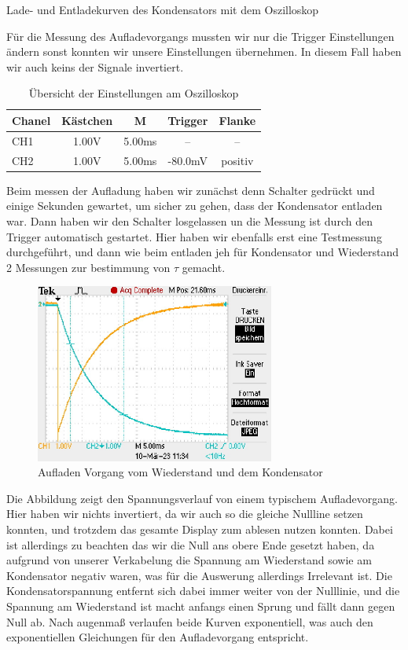 \documentclass[twoside]{protokoll}
\begin{document}
\begin{aufgabe}{Lade- und Entladekurven des Kondensators mit dem Oszilloskop}
 
Für die Messung des Aufladevorgangs mussten wir nur die Trigger Einstellungen ändern sonst konnten wir unsere Einstellungen übernehmen.
In diesem Fall haben wir auch keins der Signale invertiert. 

\begin{table}[H]
        \centering
        \begin{tabularx}{0.8\textwidth}{X c c c c} %
            \toprule
            \textbf{Chanel} & \textbf{Kästchen} & \textbf{M} & \textbf{Trigger} & \textbf{Flanke} \\
            \midrule
            CH1 & 1.00V & 5.00ms & -- & -- \\
            CH2 & 1.00V & 5.00ms & -80.0mV & positiv \\
            \bottomrule
        \end{tabularx}
        \caption{Übersicht der Einstellungen am Oszilloskop}
        \label{tab:mytable}
    \end{table}
    
Beim messen der Aufladung haben wir zunächst denn Schalter gedrückt und einige Sekunden gewartet, um sicher zu gehen, dass der Kondensator entladen war. 
Dann haben wir den Schalter losgelassen un die Messung ist durch den Trigger automatisch gestartet. 
Hier haben wir ebenfalls erst eine Testmessung durchgeführt, und dann wie beim entladen jeh für Kondensator und Wiederstand 2 Messungen zur bestimmung von $\tau$ gemacht. 

\begin{figure}[H]
  \centering
    \includegraphics[width=0.7\textwidth]{Bilder_Osziloskop/Aufladen_Kondensator_02.pdf}
    \caption{Aufladen Vorgang vom Wiederstand und dem Kondensator}
  \centering
\end{figure}
Die Abbildung zeigt den Spannungsverlauf von einem typischem Aufladevorgang.
Hier haben wir nichts invertiert, da wir auch so die gleiche Nullline setzen konnten, und trotzdem das gesamte Display zum ablesen nutzen konnten.
Dabei ist allerdings zu beachten das wir die Null ans obere Ende gesetzt haben, da aufgrund von unserer Verkabelung die Spannung am Wiederstand sowie am Kondensator negativ waren, was für die Auswerung allerdings Irrelevant ist.
Die Kondensatorspannung entfernt sich dabei immer weiter von der Nulllinie, und die Spannung am Wiederstand ist macht anfangs einen Sprung und fällt dann gegen Null ab.
Nach augenmaß verlaufen beide Kurven exponentiell, was auch den exponentiellen Gleichungen für den Aufladevorgang entspricht.


\end{aufgabe}
\end{document}

